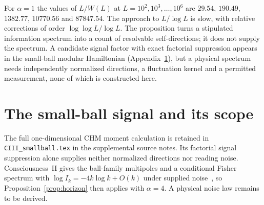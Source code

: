 \documentclass[12pt]{article}
\theoremstyle{definition}
\theoremstyle{remark}
\begin{document}
For $\alpha=1$ the values of $L/W(L)$ at $L=10^2,10^3,\dots,10^6$ are $29.54$, $190.49$, $1382.77$, $10770.56$ and $87847.54$. The approach to $L/\log L$ is slow, with relative corrections of order $\log\log L/\log L$. The proposition turns a stipulated information spectrum into a count of resolvable self-directions; it does not supply the spectrum. A candidate signal factor with exact factorial suppression appears in the small-ball modular Hamiltonian (Appendix~\ref{app:chm}), but a physical spectrum needs independently normalized directions, a fluctuation kernel and a permitted measurement, none of which is constructed here.

\section{The small-ball signal and its scope}\label{app:chm}
The full one-dimensional CHM moment calculation is retained in
\texttt{CIII\_smallball.tex} in the supplemental source notes.
Its factorial signal suppression alone supplies neither normalized
directions nor reading noise. Consciousness~II gives the ball-family
multipoles and a conditional Fisher spectrum with
$\log I_k=-4k\log k+O(k)$ under supplied noise~\cite{PaperII},
so Proposition~\ref{prop:horizon} then applies with $\alpha=4$.
A physical noise law remains to be derived.

\newpage
{}
\end{document}
